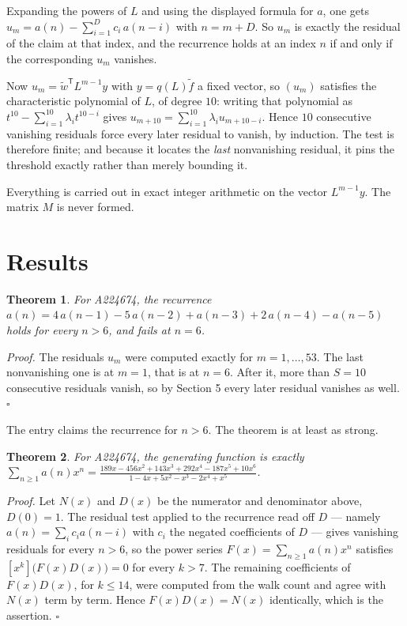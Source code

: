 \documentclass[11pt]{article}
\newtheorem{theorem}{Theorem}
\theoremstyle{definition}
\begin{document}
Expanding the powers of $L$ and using the displayed formula for $a$, one gets $u_m = a(n) - \sum_{i=1}^{D} c_i\,a(n-i)$ with $n = m + D$. So $u_m$ is exactly the residual of the claim at that index, and the recurrence holds at an index $n$ if and only if the corresponding $u_m$ vanishes.

Now $u_m = \tilde w^{\mathsf T} L^{m-1} y$ with $y = q(L)\tilde f$ a fixed vector, so $(u_m)$ satisfies the characteristic polynomial of $L$, of degree $10$: writing that polynomial as $t^{10} - \sum_{i=1}^{10} \lambda_i t^{10-i}$ gives $u_{m+10} = \sum_{i=1}^{10} \lambda_i u_{m+10-i}$. Hence $10$ consecutive vanishing residuals force every later residual to vanish, by induction. The test is therefore finite; and because it locates the {\itshape last} nonvanishing residual, it pins the threshold exactly rather than merely bounding it.

Everything is carried out in exact integer arithmetic on the vector $L^{m-1}y$. The matrix $M$ is never formed.

\section{Results}

\begin{theorem} For A224674, the recurrence $a(n) = 4\,a(n-1) - 5\,a(n-2) + a(n-3) + 2\,a(n-4) - a(n-5)$ holds for every $n > 6$, and fails at $n = 6$.\end{theorem}

{\itshape Proof.} The residuals $u_m$ were computed exactly for $m = 1,\dots,53$. The last nonvanishing one is at $m = 1$, that is at $n = 6$. After it, more than $S = 10$ consecutive residuals vanish, so by Section 5 every later residual vanishes as well. $\square$

The entry claims the recurrence for $n > 6$. The theorem is at least as strong.

\begin{theorem} For A224674, the generating function is exactly $\sum_{n\ge 1} a(n)x^n = \frac{189x - 456x^{2} + 143x^{3} + 292x^{4} - 187x^{5} + 10x^{6}}{1 - 4x + 5x^{2} - x^{3} - 2x^{4} + x^{5}}$.\end{theorem}

{\itshape Proof.} Let $N(x)$ and $D(x)$ be the numerator and denominator above, $D(0)=1$. The residual test applied to the recurrence read off $D$ --- namely $a(n) = \sum_i c_i a(n-i)$ with $c_i$ the negated coefficients of $D$ --- gives vanishing residuals for every $n > 6$, so the power series $F(x)=\sum_{n\ge 1}a(n)x^n$ satisfies $[x^k]\bigl(F(x)D(x)\bigr) = 0$ for every $k > 7$. The remaining coefficients of $F(x)D(x)$, for $k \le 14$, were computed from the walk count and agree with $N(x)$ term by term. Hence $F(x)D(x) = N(x)$ identically, which is the assertion. $\square$
\end{document}
